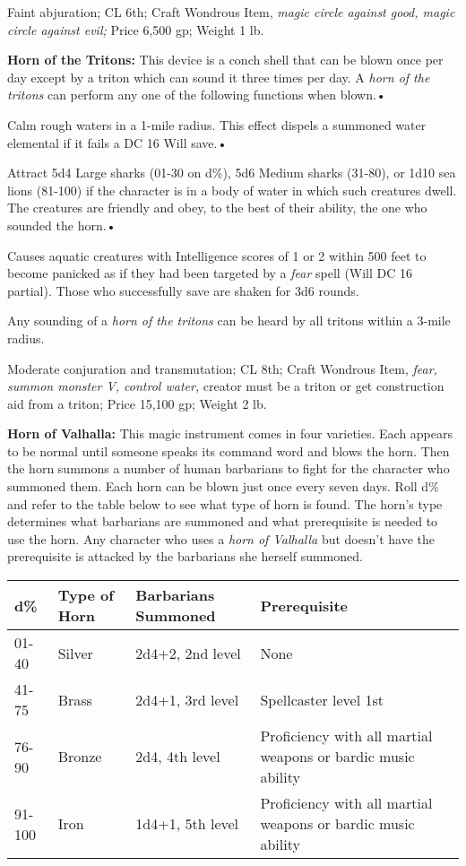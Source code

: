 \documentclass{article}
\begin{document}
Faint abjuration; CL 6th; Craft Wondrous Item, \textit{magic circle against good, 
magic circle against evil; }Price 6,500 gp; Weight 1 lb.

\textbf{Horn of the Tritons:} This device is a conch shell that can be blown once 
per day except by a triton which can sound it three times per day. A \textit{horn 
of the tritons }can perform any one of the following functions when blown.• 

\parindent=3pt
Calm rough waters in a 1-mile radius. This effect dispels a summoned water elemental 
if it fails a DC 16 Will save.• 

Attract 5d4 Large sharks (01-30 on d\%), 5d6 Medium sharks (31-80), or 1d10 sea 
lions (81-100) if the character is in a body of water in which such creatures dwell. 
The creatures are friendly and obey, to the best of their ability, the one who 
sounded the horn.• 

\parindent=7pt
Causes aquatic creatures with Intelligence scores of 1 or 2 within 500 feet to 
become panicked as if they had been targeted by a \textit{fear }spell (Will DC 
16 partial). Those who successfully save are shaken for 3d6 rounds.

\parindent=0pt
Any sounding of a \textit{horn of the tritons }can be heard by all tritons within 
a 3-mile radius.

Moderate conjuration and transmutation; CL 8th; Craft Wondrous Item, \textit{fear, 
summon monster V, control water, }creator must be a triton or get construction 
aid from a triton; Price 15,100 gp; Weight 2 lb.

\textbf{Horn of Valhalla:} This magic instrument comes in four varieties. Each 
appears to be normal until someone speaks its command word and blows the horn. 
Then the horn summons a number of human barbarians to fight for the character who 
summoned them. Each horn can be blown just once every seven days. Roll d\% and 
refer to the table below to see what type of horn is found. The horn's type determines 
what barbarians are summoned and what prerequisite is needed to use the horn. Any 
character who uses a \textit{horn of Valhalla }but doesn't have the prerequisite 
is attacked by the barbarians she herself summoned.

\begin{tabular}{|>{\raggedright}p{24pt}|>{\raggedright}p{41pt}|>{\raggedright}p{70pt}|>{\raggedright}p{165pt}|}
\hline
d\textbf{\%} & T\textbf{ype of Horn} & B\textbf{arbarians Summoned} & P\textbf{rerequisite}\tabularnewline
\hline
01-40 & Silver & 2d4+2, 2nd level & None\tabularnewline
\hline
41-75 & Brass & 2d4+1, 3rd level & Spellcaster level 1st\tabularnewline
\hline
76-90 & Bronze & 2d4, 4th level & Proficiency with all martial weapons or bardic 
music ability\tabularnewline
\hline
91-100 & Iron & 1d4+1, 5th level & Proficiency with all martial weapons or bardic 
music ability\tabularnewline
\hline
\end{tabular}
\end{document}
